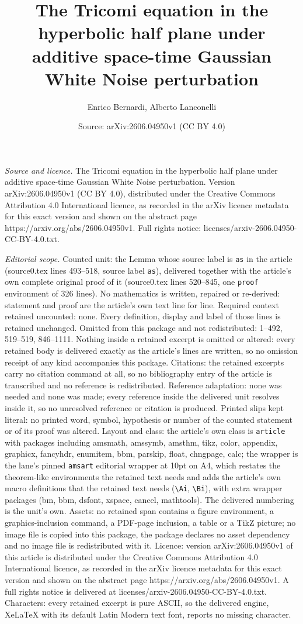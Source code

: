\documentclass[10pt,a4paper]{amsart}
\title[The Tricomi equation in the hyperbolic half plane under addi]{The Tricomi equation in the hyperbolic half plane under additive space-time Gaussian White Noise perturbation}
\author{Enrico Bernardi, Alberto Lanconelli}
\date{Source: arXiv:2606.04950v1 (CC BY 4.0)}
\begin{document}
\maketitle

\noindent\emph{Source and licence.} The Tricomi equation in the hyperbolic half plane under additive space-time Gaussian White Noise perturbation. Version arXiv:2606.04950v1 (CC BY 4.0), distributed under the Creative Commons Attribution 4.0 International licence, as recorded in the arXiv licence metadata for this exact version and shown on the abstract page https://arxiv.org/abs/2606.04950v1. Full rights notice: licenses/arxiv-2606.04950-CC-BY-4.0.txt.\par\smallskip

\noindent\textit{Editorial scope.} Counted unit: the Lemma whose source label is \texttt{as} in the article (source0.tex lines 493--518, source label \texttt{as}), delivered together with the article's own complete original proof of it (source0.tex lines 520--845, one \texttt{proof} environment of 326 lines). No mathematics is written, repaired or re-derived: statement and proof are the article's own text line for line. Required context retained uncounted: none. Every definition, display and label of those lines is retained unchanged. Omitted from this package and not redistributed: 1--492, 519--519, 846--1111. Nothing inside a retained excerpt is omitted or altered: every retained body is delivered exactly as the article's lines are written, so no omission receipt of any kind accompanies this package. Citations: the retained excerpts carry no citation command at all, so no bibliography entry of the article is transcribed and no reference is redistributed. Reference adaptation: none was needed and none was made; every reference inside the delivered unit resolves inside it, so no unresolved reference or citation is produced. Printed slips kept literal: no printed word, symbol, hypothesis or number of the counted statement or of its proof was altered. Layout and class: the article's own class is \texttt{article} with packages including amsmath, amssymb, amsthm, tikz, color, appendix, graphicx, fancyhdr, enumitem, bbm, parskip, float, chngpage, calc; the wrapper is the lane's pinned \texttt{amsart} editorial wrapper at 10pt on A4, which restates the theorem-like environments the retained text needs and adds the article's own macro definitions that the retained text needs (\texttt{\textbackslash Ai}, \texttt{\textbackslash Bi}), with extra wrapper packages (bm, bbm, dsfont, xspace, cancel, mathtools). The delivered numbering is the unit's own. Assets: no retained span contains a figure environment, a graphics-inclusion command, a PDF-page inclusion, a table or a TikZ picture; no image file is copied into this package, the package declares no asset dependency and no image file is redistributed with it. Licence: version arXiv:2606.04950v1 of this article is distributed under the Creative Commons Attribution 4.0 International licence, as recorded in the arXiv licence metadata for this exact version and shown on the abstract page https://arxiv.org/abs/2606.04950v1. A full rights notice is delivered at licenses/arxiv-2606.04950-CC-BY-4.0.txt. Characters: every retained excerpt is pure ASCII, so the delivered engine, XeLaTeX with its default Latin Modern text font, reports no missing character.
\end{document}
